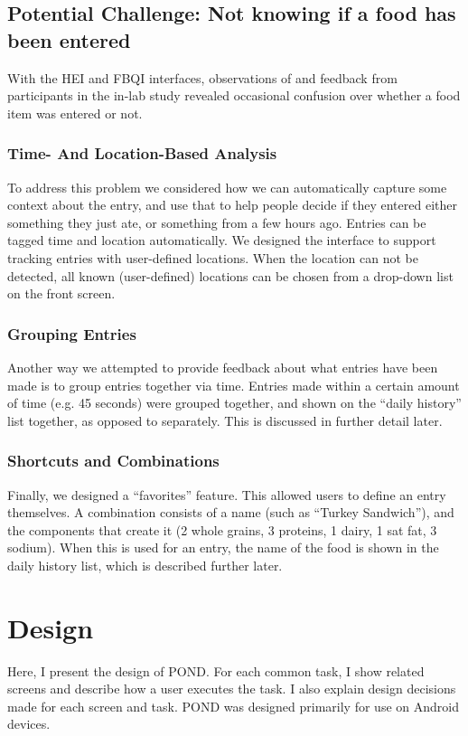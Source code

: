 \subsection{Potential Challenge: Not knowing if a food has been entered}

With the HEI and FBQI interfaces, observations of and feedback from participants in the in-lab study revealed occasional confusion over whether a food item was entered or not. 

\subsubsection{Time- And Location-Based Analysis}
To address this problem we considered how we can automatically capture some context about the entry, and use that to help people decide if they entered either something they just ate, or something from a few hours ago. Entries can be tagged time and location automatically. We designed the interface to support tracking entries with user-defined locations. When the location can not be detected, all known (user-defined) locations can be chosen from a drop-down list on the front screen. 

\subsubsection{Grouping Entries}
Another way we attempted to provide feedback about what entries have been made is to group entries together via time. Entries made within a certain amount of time (e.g. 45 seconds) were grouped together, and shown on the ``daily history'' list together, as opposed to separately. This is discussed in further detail later. 

\subsubsection{Shortcuts and Combinations}

Finally, we designed a ``favorites'' feature. This allowed users to define an entry themselves. A combination consists of a name (such as ``Turkey Sandwich''), and the components that create it (2 whole grains, 3 proteins, 1 dairy, 1 sat fat, 3 sodium). When this is used for an entry, the name of the food is shown in the daily history list, which is described further later. 

\section{Design}
Here, I present the design of POND. For each common task, I show related screens and describe how a user executes the task. I also explain design decisions made for each screen and task. POND was designed primarily for use on Android devices. 

